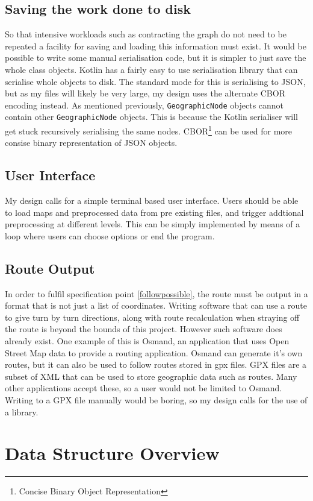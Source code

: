 \documentclass[11pt,twoside,a4paper]{report}
\begin{document}
\subsection{Saving the work done to disk}
\label{sec:serialization}
So that intensive workloads such as contracting the graph do not need to be repeated a facility for saving and loading this information must exist.
It would be possible to write some manual serialisation code, but it is simpler to just save the whole class objects. Kotlin has a 
fairly easy to use serialisation library that can serialise whole objects to disk\cite{kotlinh}. The standard mode for this is serialising to JSON, but as my files will likely be very large, my design uses the alternate CBOR encoding instead.
As mentioned previously, \texttt{GeographicNode} objects cannot contain other \texttt{GeographicNode} objects. This is because the Kotlin serialiser will get stuck recursively serialising the same nodes. 
CBOR\footnote{Concise Binary Object Representation} can be used for more consise binary representation of JSON objects.
\subsection{User Interface}
My design calls for a simple terminal based user interface. Users should be able to load maps and preprocessed data from pre existing files, and trigger addtional preprocessing at different levels. This can be simply implemented by means of a loop where users can choose options or end the program.
\subsection{Route Output}
In order to fulfil specification point \ref{followpossible}, the route must be output in a format that is not just a list of coordinates. Writing software that can use a route to give turn by turn directions, 
along with route recalculation when straying off the route is beyond the bounds of this project. However such software does already exist. One example of this is Osmand, an application that uses Open Street Map data to provide a routing application.
Osmand can generate it's own routes, but it can also be used to follow routes stored in gpx files. GPX files are a subset of XML that can be used to store geographic data such as routes. Many other applications accept these, so a user would not 
be limited to Osmand. Writing to a GPX file manually would be boring, so my design calls for the use of a library. 
\section{Data Structure Overview}
\end{document}
